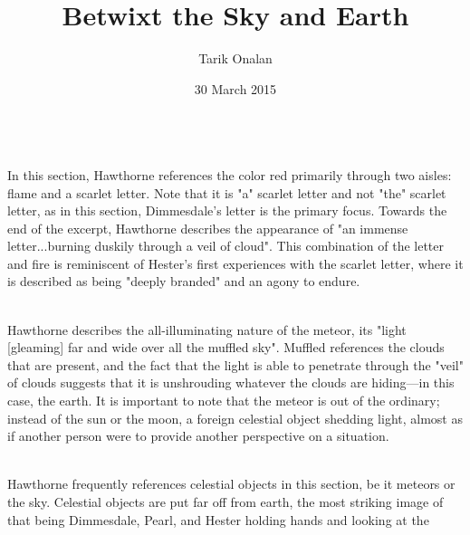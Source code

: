 \documentclass[12pt,a4paper]{article}
\title{Betwixt the Sky and Earth}
\date{30 March 2015}
\author{Tarik Onalan}
\begin{document}
    \maketitle
    \noindent
    \\
    In this section, Hawthorne references the color red primarily through two aisles:
    flame and a scarlet letter. Note that it is "a" scarlet letter and not "the" scarlet
    letter, as in this section, Dimmesdale's letter is the primary focus. Towards the
    end of the excerpt, Hawthorne describes the appearance of "an immense letter...burning
    duskily through a veil of cloud". This combination of the letter and fire is reminiscent
    of Hester's first experiences with the scarlet letter, where it is described as being
    "deeply branded" and an agony to endure.
    \\
    \\
    Hawthorne describes the all-illuminating nature of the meteor, its "light [gleaming]
    far and wide over all the muffled sky". Muffled references the clouds that are present,
    and the fact that the light is able to penetrate through the "veil" of clouds suggests
    that it is unshrouding whatever the clouds are hiding---in this case, the earth.
    It is important to note that the meteor is out of the ordinary; instead of the
    sun or the moon, a foreign celestial object shedding light, almost as if another
    person were to provide another perspective on a situation.
    \\
    \\
    Hawthorne frequently references celestial objects in this section, be it meteors
    or the sky. Celestial objects are put far off from earth, the most striking image
    of that being Dimmesdale, Pearl, and Hester holding hands and looking at the
\end{document}
